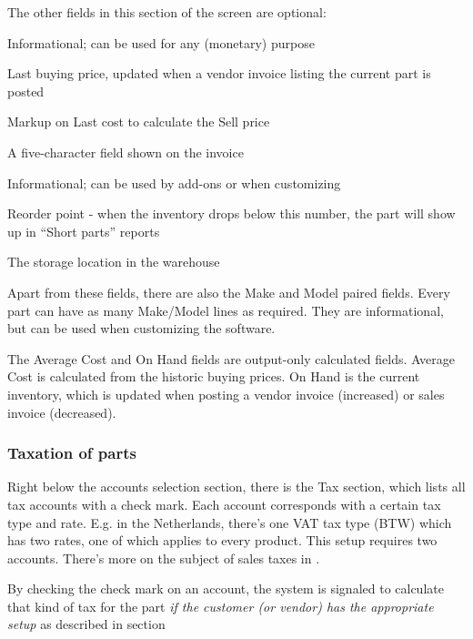 The other fields in this section of the screen are optional:

\begin{description}[style=nextline]
\item [List price] Informational; can be used for any (monetary) purpose
\item [Last cost] Last buying price, updated when a vendor invoice listing the current part
    is posted
\item [Markup percentage] Markup on Last cost to calculate the Sell price
\item [Image]
\item [Drawing]
\item [Microfiche]
\item [Unit] A five-character field shown on the invoice
\item [Weight] Informational; can be used by \glspl{add-on} or when customizing
\item [ROP] Reorder point - when the inventory drops below this number,
     the part will show up in ``Short parts'' reports
\item [Bin] The storage location in the warehouse
\end{description}


Apart from these fields, there are also the Make and Model paired fields. Every part
can have as many Make/Model lines as required. They are informational, but can be used
when customizing the software.

The Average Cost and On Hand fields are output-only calculated fields. Average Cost is
calculated from the historic buying prices. On Hand is the current inventory, which is
updated when posting a vendor invoice (increased) or sales invoice (decreased).



\subsubsection{Taxation of parts}
\label{subsubsec-products-parts-taxation}

Right below the accounts selection section, there is the Tax section, which lists
all tax accounts with a check mark. Each account corresponds with a certain tax type
and rate. E.g. in the Netherlands, there's one VAT tax type (BTW) which has two rates,
one of which applies to every product. This setup requires two accounts. There's more
on the subject of sales taxes in .

By checking the check mark on an account, the system is signaled to calculate that
kind of tax for the part {\it if the customer (or vendor) has the appropriate setup}
as described in section


